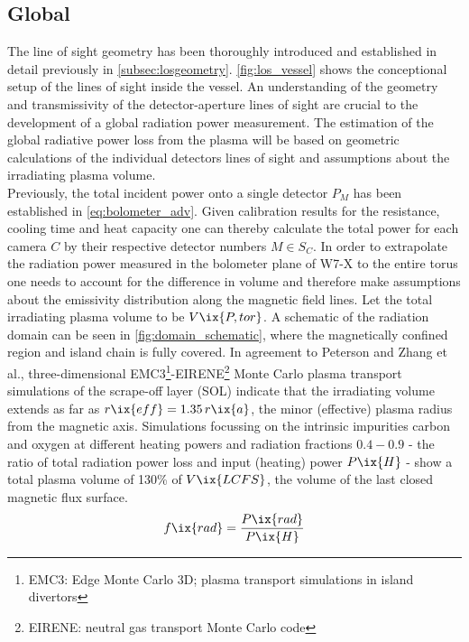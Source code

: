         \subsection{Global}\label{subsec:global}
%
            The line of sight geometry has been thoroughly introduced and established in detail previously in \cref{subsec:losgeometry}. \autoref{fig:los_vessel} shows the conceptional setup of the lines of sight inside the vessel. An understanding of the geometry and transmissivity of the detector-aperture lines of sight are crucial to the development of a global radiation power measurement. The estimation of the global radiative power loss from the plasma will be based on geometric calculations of the individual detectors lines of sight and assumptions about the irradiating plasma volume.\\%
            Previously, the total incident power onto a single detector $P_{M}$ has been established in \cref{eq:bolometer_adv}. Given calibration results for the resistance, cooling time and heat capacity one can thereby calculate the total power for each camera $C$ by their respective detector numbers $M\in S_{C}$. In order to extrapolate the radiation power measured in the bolometer plane of W7-X to the entire torus one needs to account for the difference in volume and therefore make assumptions about the emissivity distribution along the magnetic field lines. Let the total irradiating plasma volume to be $V\ix{P, tor}$. A schematic of the radiation domain can be seen in \cref{fig:domain_schematic}, where the magnetically confined region and island chain is fully covered. In agreement to Peterson and Zhang et al.\cite{Peterson2016_EPS,Zhang2013}, three-dimensional EMC3\footnote[1]{EMC3: Edge Monte Carlo 3D; plasma transport simulations in island divertors}-EIRENE\footnote[2]{EIRENE: neutral gas transport Monte Carlo code} Monte Carlo plasma transport simulations of the scrape-off layer (SOL)\cite{Feng1997,Reiter2005} indicate that the irradiating volume extends as far as $r\ix{eff}=1.35\,r\ix{a}$, the minor (effective) plasma radius from the magnetic axis. Simulations focussing on the intrinsic impurities carbon and oxygen at different heating powers and radiation fractions $0.4-0.9$ - the ratio of total radiation power loss and input (heating) power $P\ix{H}$ - show a total plasma volume of 130\% of $V\ix{LCFS}$, the volume of the last closed magnetic flux surface.%
%
            \begin{align}%
                f\ix{rad}=\frac{P\ix{rad}}{P\ix{H}}\label{eq:fraction}%
            \end{align}%
